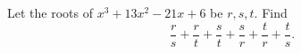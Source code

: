 Let the roots of $x^3+13x^2-21x+6$ be $r,s,t$. Find
\[\dfrac rs+\dfrac rt+\dfrac st+\dfrac sr+\dfrac tr+\dfrac ts.\]
